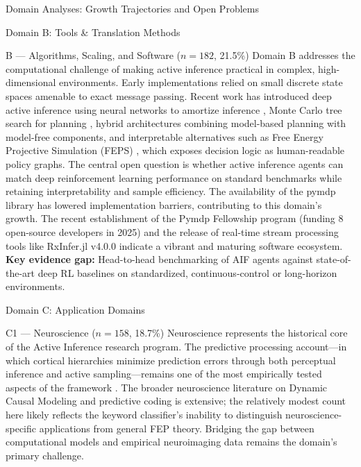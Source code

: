 \documentclass[
  ignorenonframetext,
]{beamer}
\begin{document}
\begin{frame}{Domain Analyses: Growth Trajectories and Open Problems
\label{sec:subfield_analyses}}
\begin{block}{Domain B: Tools \& Translation Methods}
\protect{}\label{domain-b-tools-translation-methods}
\begin{block}{B --- Algorithms, Scaling, and Software (\(n = 182\),
21.5\%)}
\protect{}\label{b-algorithms-scaling-and-software-n-182-21.5}
Domain B addresses the computational challenge of making active
inference practical in complex, high-dimensional environments. Early
implementations relied on small discrete state spaces amenable to exact
message passing. Recent work has introduced deep active inference using
neural networks to amortize inference \citep{fountas2020deep}, Monte
Carlo tree search for planning \citep{champion2021realizing}, hybrid
architectures combining model-based planning with model-free components,
and interpretable alternatives such as Free Energy Projective Simulation
(FEPS) \citep{pazem2024feps}, which exposes decision logic as
human-readable policy graphs. The central open question is whether
active inference agents can match deep reinforcement learning
performance on standard benchmarks while retaining interpretability and
sample efficiency. The availability of the pymdp library
\citep{heins2022pymdp} has lowered implementation barriers, contributing
to this domain's growth. The recent establishment of the Pymdp
Fellowship program (funding 8 open-source developers in 2025) and the
release of real-time stream processing tools like RxInfer.jl v4.0.0
\citep{rxinfer2025} indicate a vibrant and maturing software ecosystem.
\textbf{Key evidence gap:} Head-to-head benchmarking of AIF agents
against state-of-the-art deep RL baselines on standardized,
continuous-control or long-horizon environments.
\end{block}
\end{block}

\begin{block}{Domain C: Application Domains}
\protect{}\label{domain-c-application-domains}
\begin{block}{C1 --- Neuroscience (\(n = 158\), 18.7\%)}
\protect{}\label{c1-neuroscience-n-158-18.7}
Neuroscience represents the historical core of the Active Inference
research program. The predictive processing account---in which cortical
hierarchies minimize prediction errors through both perceptual inference
and active sampling---remains one of the most empirically tested aspects
of the framework \citep{friston2010free, clark2013whatever}. The broader
neuroscience literature on Dynamic Causal Modeling and predictive coding
is extensive; the relatively modest count here likely reflects the
keyword classifier's inability to distinguish neuroscience-specific
applications from general FEP theory. Bridging the gap between
computational models and empirical neuroimaging data remains the
domain's primary challenge.
\end{block}


\end{block}
\end{frame}
\end{document}
